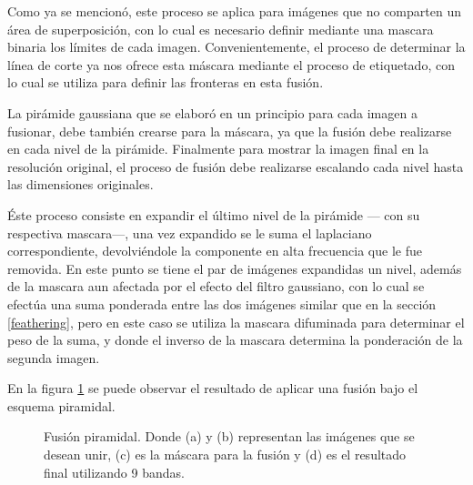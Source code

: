 Como ya se mencionó, este proceso se aplica para imágenes que no comparten un área de superposición, con lo cual es necesario definir mediante una mascara binaria los límites de cada imagen. Convenientemente, el proceso de determinar la línea de corte ya nos ofrece esta máscara mediante el proceso de etiquetado, con lo cual se utiliza para definir las fronteras en esta fusión.

La pirámide gaussiana que se elaboró en un principio para cada imagen a fusionar, debe también crearse para la máscara, ya que la fusión debe realizarse en cada nivel de la pirámide. Finalmente para mostrar la imagen final en la resolución original, el proceso de fusión debe realizarse escalando cada nivel hasta las dimensiones originales.

Éste proceso consiste en expandir el último nivel de la pirámide --- con su respectiva mascara---, una vez expandido se le suma el laplaciano correspondiente, devolviéndole la componente en alta frecuencia que le fue removida. En este punto se tiene el par de imágenes expandidas un nivel, además de la mascara aun afectada por el efecto del filtro gaussiano, con lo cual se efectúa una suma ponderada entre las dos imágenes similar que en la sección \ref{feathering}, pero en este caso se utiliza la mascara difuminada para determinar el peso de la suma, y donde el inverso de la mascara determina la ponderación de la segunda imagen.

En la figura \ref{imagen:blend-apple} se puede observar el resultado de aplicar una fusión bajo el esquema piramidal.

\begin{figure}[H]
	\centering     %
	
	
	\caption[Ejemplo de fusión pirámidal]{Fusión piramidal. Donde (a) y (b) representan las imágenes que se desean unir, (c) es la máscara para la fusión y (d) es el resultado final utilizando 9 bandas\protect\footnotemark.}
	\label{imagen:blend-apple}
\end{figure}
